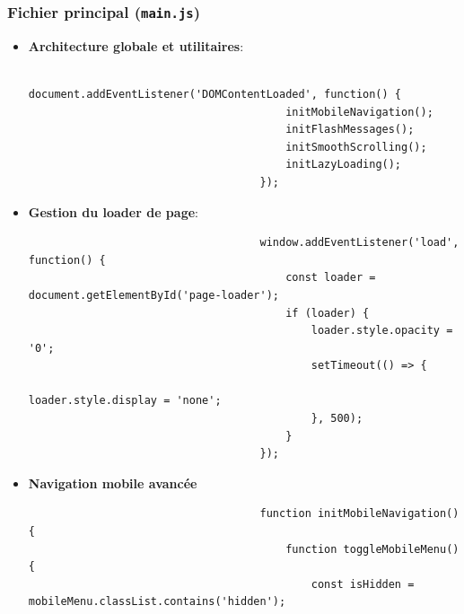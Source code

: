\documentclass[a4paper,11pt]{article}
\begin{document}
                \subsubsection{Fichier principal (\texttt{main.js})}
                    \begin{itemize}
                        \item \textbf{Architecture globale et utilitaires}:
                            \begin{tcolorbox}[colback=lightgray!5, colframe=gray!80, left=-70mm, right=5mm, top=2mm, bottom=0mm, boxrule=0.1mm]
                                \begin{verbatim}
                                    document.addEventListener('DOMContentLoaded', function() {
                                        initMobileNavigation();
                                        initFlashMessages();
                                        initSmoothScrolling();
                                        initLazyLoading();
                                    });
                                \end{verbatim}
                            \end{tcolorbox}

                        \item \textbf{Gestion du loader de page}:
                            \begin{tcolorbox}[colback=lightgray!5, colframe=gray!80, left=-70mm, right=5mm, top=2mm, bottom=0mm, boxrule=0.1mm]
                                \begin{verbatim}
                                    window.addEventListener('load', function() {
                                        const loader = document.getElementById('page-loader');
                                        if (loader) {
                                            loader.style.opacity = '0';
                                            setTimeout(() => {
                                                loader.style.display = 'none';
                                            }, 500);
                                        }
                                    });
                                \end{verbatim}
                            \end{tcolorbox}

                        \item \textbf{Navigation mobile avancée}
                            \begin{tcolorbox}[colback=lightgray!5, colframe=gray!80, left=-70mm, right=5mm, top=2mm, bottom=0mm, boxrule=0.1mm]
                                \begin{verbatim}
                                    function initMobileNavigation() {
                                        function toggleMobileMenu() {
                                            const isHidden = mobileMenu.classList.contains('hidden');
                                            

\end{verbatim}
\end{tcolorbox}
\end{itemize}
\end{document}
